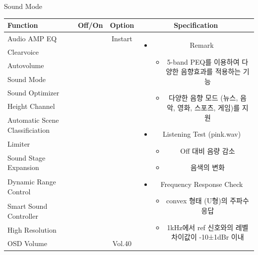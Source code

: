 \documentclass{beamer}
\begin{document}
\begin{frame}[t]{Sound Mode}
\begin{tiny}
\begin{tabular}{@{}lccc@{}}
\toprule
Function & Off/On & Option & Specification \\
\midrule
Audio AMP EQ & \color{black}{Off} & Instart &
\multirow{13}{60mm}{
\begin{itemize}
\item Remark
	\begin{itemize}
	\item 5-band PEQ를 이용하여 다양한 음향효과를 적용하는 기능
	\item 다양한 음향 모드 (뉴스, 음악, 영화, 스포츠, 게임)를 지원
	\end{itemize}
\item Listening Test (pink.wav)
	\begin{itemize}
	\item Off 대비 음량 감소
	\item 음색의 변화
	\end{itemize}
\item Frequency Response Check
  \begin{itemize}
  \item convex 형태 (U형)의 주파수응답
  \item 1kHz에서 ref 신호와의 레벨 차이값이 -10±1dBr 이내
  \end{itemize}
\end{itemize}
} \\
Clearvoice & \color{black}{Off} & & \\
Autovolume & \color{black}{Off} & & \\
Sound Mode & \color{blue}{On} & & \\
Sound Optimizer & \color{black}{Off} & & \\
Height Channel & \color{black}{Off} & & \\
Automatic Scene Classificiation & \color{black}{Off} & & \\
Limiter & \color{black}{Off} & & \\
Sound Stage Expansion & \color{black}{Off} & & \\
Dynamic Range Control & \color{black}{Off} & & \\
Smart Sound Controller & \color{black}{Off} & & \\
High Resolution & \color{black}{Off} & & \\
OSD Volume & \color{blue}{On} & Vol.40 & \\
\midrule
\end{tabular}
\end{tiny}


\end{frame}
\end{document}
